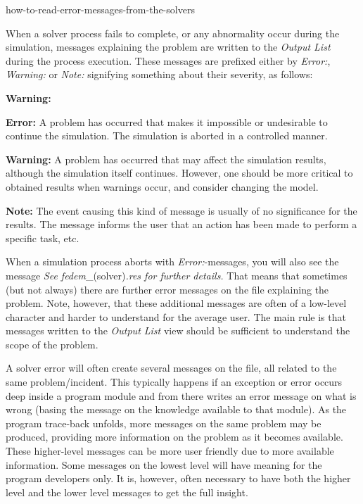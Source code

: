{
           {how-to-read-error-messages-from-the-solvers}

When a solver process fails to complete, or any abnormality occur during the
simulation, messages explaining the problem are written to the {\sl Output List}
during the process execution.
These messages are prefixed either by {\sl Error:}, {\sl Warning:}
or {\sl Note:} signifying something about their severity, as follows:

\begin{namelist}{\textbf{Warning:}}
\item[\textbf{Error:}]
  A problem has occurred that makes it impossible or undesirable to continue
  the simulation. The simulation is aborted in a controlled manner.

\item[\textbf{Warning:}]
  A problem has occurred that may affect the simulation results,
  although the simulation itself continues. However, one should be more critical
  to obtained results when warnings occur, and consider changing the model.

\item[\textbf{Note:}]
  The event causing this kind of message is usually of no significance for the
  results. The message informs the user that an action has been made to perform
  a specific task, etc.
\end{namelist}

When a simulation process aborts with {\sl Error:}-messages, you will also see
the message {\sl See fedem}\_(solver){\sl .res for further details.}
That means that sometimes (but not always) there are further error messages
on the  file explaining the problem.
Note, however, that these additional messages are often of a low-level
character and harder to understand for the average user.
The main rule is that messages written to the {\sl Output List} view should be
sufficient to understand the scope of the problem.


A solver error will often create several messages on the  file,
all related to the same problem/incident. This typically happens if an exception
or error occurs deep inside a program module and from there writes an error
message on what is wrong (basing the message on the knowledge available to that
module). As the program trace-back unfolds, more messages on the same problem
may be produced, providing more information on the problem as it becomes
available. These higher-level messages can be more user friendly due to more
available information. Some messages on the lowest level will have meaning for
the program developers only. It is, however, often necessary to have both the
higher level and the lower level messages to get the full insight.

}
